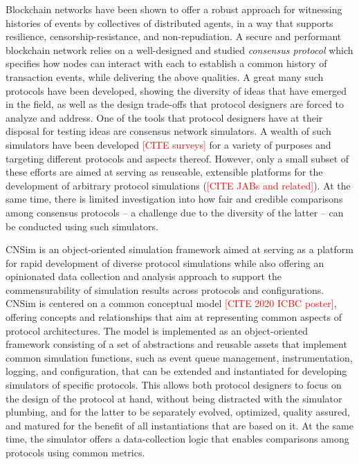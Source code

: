 \documentclass[conference]{IEEEtran}
\newcommand{\rc}[1]{\textcolor{red}{[#1]}\xspace}
\begin{document}
Blockchain networks have been shown to offer a robust approach for witnessing histories of events by collectives of distributed agents, in a way that supports resilience, censorship-resistance, and non-repudiation. A secure and performant blockchain network relies on a well-designed and studied \textit{consensus protocol} which specifies how nodes can interact with each to establish a common history of transaction events, while delivering the above qualities. A great many such protocols have been developed, showing the diversity of ideas that have emerged in the field, as well as the design trade-offs that protocol designers are forced to analyze and address. One of the tools that protocol designers have at their disposal for testing ideas are consensus network simulators. A wealth of such simulators have been developed \rc{CITE surveys} for a variety of purposes and targeting different protocols and aspects thereof. However, only a small subset of these efforts are aimed at serving as reuseable, extensible platforms for the development of arbitrary protocol simulations (\rc{CITE JABs and related}). At the same time, there is limited investigation into how fair and credible comparisons among consensus protocols -- a challenge due to the diversity of the latter -- can be conducted using such simulators.

CNSim is an object-oriented simulation framework aimed at serving as a platform for rapid development of diverse protocol simulations while also offering an opinionated data collection and analysis approach to support the commensurability of simulation results across protocols and configurations. CNSim is centered on a common conceptual model  \rc{CITE 2020 ICBC poster}, offering concepts and relationships that aim at representing common aspects of protocol architectures. The model is implemented as an object-oriented framework consisting of a set of abstractions and reusable assets that implement common simulation functions, such as event queue management, instrumentation, logging, and  configuration, that can be extended and instantiated for developing simulators of specific protocols. This allows both protocol designers to focus on the design of the protocol at hand, without being distracted with the simulator plumbing, and for the latter to be separately evolved, optimized, quality assured, and matured for the benefit of all instantiations that are based on it. At the same time, the simulator offers a data-collection logic that enables comparisons among protocols using common metrics.
\end{document}
